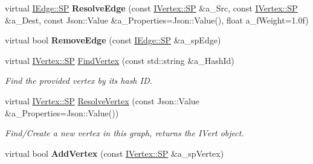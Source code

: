 \begin{DoxyCompactItemize}
\item 
\mbox{\label{class_graph_self_a71fa21ced08e0ab887c3805ec5b2220d}} 
virtual \hyperlink{class_i_graph_1_1_i_edge_adfae3ec3e377543685a06b9c5d5a776a}{I\+Edge\+::\+SP} {\bfseries Resolve\+Edge} (const \hyperlink{class_i_graph_1_1_i_vertex_af72b9df91f110bc7824c608c10cc819c}{I\+Vertex\+::\+SP} \&a\+\_\+\+Src, const \hyperlink{class_i_graph_1_1_i_vertex_af72b9df91f110bc7824c608c10cc819c}{I\+Vertex\+::\+SP} \&a\+\_\+\+Dest, const Json\+::\+Value \&a\+\_\+\+Properties=Json\+::\+Value(), float a\+\_\+f\+Weight=1.\+0f)
\item 
\mbox{\label{class_graph_self_aa83ef575c368738ed3e697fd19b16ce2}} 
virtual bool {\bfseries Remove\+Edge} (const \hyperlink{class_i_graph_1_1_i_edge_adfae3ec3e377543685a06b9c5d5a776a}{I\+Edge\+::\+SP} \&a\+\_\+sp\+Edge)
\item 
\mbox{\label{class_graph_self_a6afb274f3c9d5b016be3fe3fcd5fc8e6}} 
virtual \hyperlink{class_i_graph_1_1_i_vertex_af72b9df91f110bc7824c608c10cc819c}{I\+Vertex\+::\+SP} \hyperlink{class_graph_self_a6afb274f3c9d5b016be3fe3fcd5fc8e6}{Find\+Vertex} (const std\+::string \&a\+\_\+\+Hash\+Id)
\begin{DoxyCompactList}\small\item\em Find the provided vertex by it\textquotesingle{}s hash ID. \end{DoxyCompactList}\item 
\mbox{\label{class_graph_self_aeb2c9da8116fe4d60649d81a9d32e109}} 
virtual \hyperlink{class_i_graph_1_1_i_vertex_af72b9df91f110bc7824c608c10cc819c}{I\+Vertex\+::\+SP} \hyperlink{class_graph_self_aeb2c9da8116fe4d60649d81a9d32e109}{Resolve\+Vertex} (const Json\+::\+Value \&a\+\_\+\+Properties=Json\+::\+Value())
\begin{DoxyCompactList}\small\item\em Find/\+Create a new vertex in this graph, returns the I\+Vert object. \end{DoxyCompactList}\item 
\mbox{\label{class_graph_self_a01288cd0b6d452b72b619f1a2f9564f6}} 
virtual bool {\bfseries Add\+Vertex} (const \hyperlink{class_i_graph_1_1_i_vertex_af72b9df91f110bc7824c608c10cc819c}{I\+Vertex\+::\+SP} \&a\+\_\+sp\+Vertex)
\item 

\end{DoxyCompactItemize}
